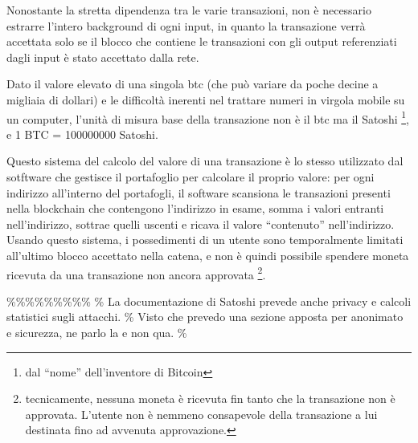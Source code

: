 Nonostante la stretta dipendenza tra le varie transazioni, non è
necessario estrarre l'intero background di ogni input, in quanto la
transazione verrà accettata solo se il blocco che contiene le
transazioni con gli output referenziati dagli input è stato accettato
dalla rete.

Dato il valore elevato di una singola btc (che può variare da poche
decine a migliaia di dollari) e le difficoltà inerenti nel trattare
numeri in virgola mobile su un computer, l'unità di misura base della
transazione non è il btc ma il Satoshi \footnote{dal ``nome''
  dell'inventore di Bitcoin}, e 1 BTC = 100000000 Satoshi.

Questo sistema del calcolo del valore di una transazione è lo stesso
utilizzato dal sotftware che gestisce il portafoglio per calcolare il
proprio valore: per ogni indirizzo all'interno del portafogli, il
software scansiona le transazioni presenti nella blockchain che
contengono l'indirizzo in esame, somma i valori entranti nell'indirizzo,
sottrae quelli uscenti e ricava il valore ``contenuto'' nell'indirizzo.
Usando questo sistema, i possedimenti di un utente sono temporalmente
limitati all'ultimo blocco accettato nella catena, e non è quindi
possibile spendere moneta ricevuta da una transazione non ancora
approvata \footnote{tecnicamente, nessuna moneta è ricevuta fin tanto
  che la transazione non è approvata. L'utente non è nemmeno consapevole
  della transazione a lui destinata fino ad avvenuta approvazione.}.

\%\%\%\%\%\%\%\%\% \% La documentazione di Satoshi prevede anche privacy
e calcoli statistici sugli attacchi. \% Visto che prevedo una sezione
apposta per anonimato e sicurezza, ne parlo la e non qua. \%
